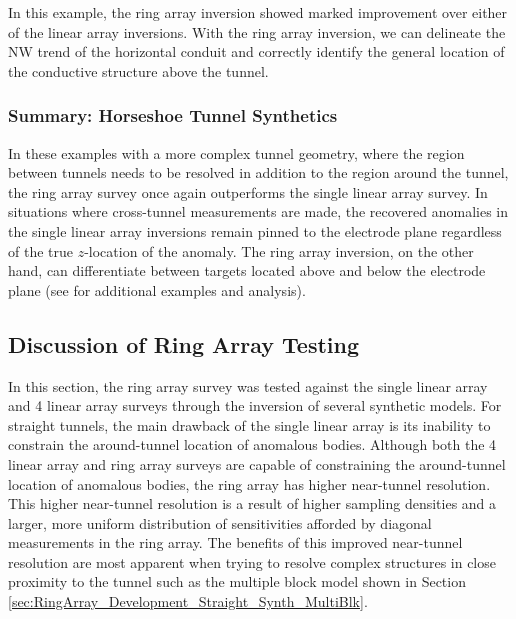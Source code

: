 \documentclass[preprint,authoryear,12pt]{elsarticle}
\begin{document}
In this example, the ring array inversion showed marked improvement over either of the linear array inversions. With the ring array inversion, we can delineate the NW trend of the horizontal conduit and correctly identify the general location of the conductive structure above the tunnel.


\subsubsection{Summary: Horseshoe Tunnel Synthetics}
\label{sec:RingArray_Development_Horseshoe_Synthetics_Summary}

In these examples with a more complex tunnel geometry, where the region between tunnels needs to be resolved in addition to the region around the tunnel, the ring array survey once again outperforms the single linear array survey. In situations where cross-tunnel measurements are made, the recovered anomalies in the single linear array inversions remain pinned to the electrode plane regardless of the true $z$-location of the anomaly. The ring array inversion, on the other hand, can differentiate between targets located above and below the electrode plane (see \citet{Mitchell2020} for additional examples and analysis).


\subsection{Discussion of Ring Array Testing}
\label{sec:Discussion_RingArray_Testing}

In this section, the ring array survey was tested against the single linear array and 4 linear array surveys through the inversion of several synthetic models. For straight tunnels, the main drawback of the single linear array is its inability to constrain the around-tunnel location of anomalous bodies. Although both the 4 linear array and ring array surveys are capable of constraining the around-tunnel location of anomalous bodies, the ring array has higher near-tunnel resolution. This higher near-tunnel resolution is a result of higher sampling densities and a larger, more uniform distribution of sensitivities afforded by diagonal measurements in the ring array. The benefits of this improved near-tunnel resolution are most apparent when trying to resolve complex structures in close proximity to the tunnel such as the multiple block model shown in Section \ref{sec:RingArray_Development_Straight_Synth_MultiBlk}.
\end{document}
